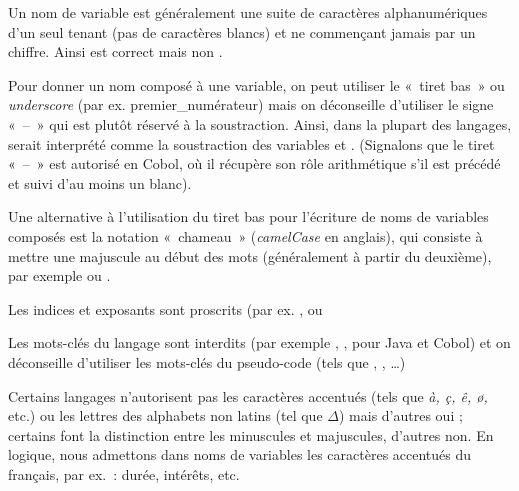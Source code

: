 			\begin{liste}
			\item 
				Un nom de variable est généralement une suite de caractères
				alphanumériques d’un seul tenant (pas de caractères blancs) et ne
				commençant jamais par un chiffre. Ainsi  est
				correct mais non . 
			\item 
				Pour donner un nom composé à une variable, on peut utiliser le «~tiret
				bas~» ou \textit{underscore} (par ex. premier\_numérateur) mais on
				déconseille d’utiliser le signe «~–~» qui est plutôt réservé à la
				soustraction. Ainsi, dans la plupart des langages,
				 serait interprété comme la
				soustraction des variables  et
				. (Signalons que le tiret 
				\textcolor{black}{«~–~»} est autorisé en Cobol, où il récupère son rôle
				arithmétique s’il est précédé et suivi d’au moins un blanc).
			\item 
				Une alternative à l’utilisation du tiret bas pour l’écriture de noms de
				variables composés est la notation «~chameau~» (\textit{camelCase} en
				anglais), qui consiste à mettre une majuscule au début des mots
				(généralement à partir du deuxième), par exemple
				 ou
				.
			\item
				Les indices et exposants sont proscrits (par ex.
				,
				 ou
			\item
				Les mots-clés du langage sont interdits (par exemple
				, , 
				pour Java et Cobol) et on déconseille 
				d’utiliser les mots-clés du pseudo-code (tels que
				, 
				, 
				…)
			\item
				Certains langages n’autorisent pas les caractères accentués (tels que
				\textit{à, ç, ê, ø,} etc.) ou les lettres des alphabets non latins
				(tel que ${\Delta}$) mais d’autres oui ; certains font la distinction
				entre les minuscules et majuscules, d’autres non. En logique, nous
				admettons dans noms de variables les caractères accentués du français,
				par ex.~: durée, intérêts, etc.
			\end{liste}

